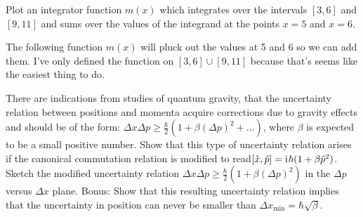 \documentclass[boxes,pages]{homework}
\makeatletter
\newcommand{\iu}{\mathrm{i}\mkern1mu}
\numberwithin{@problem}{section}
\makeatother
\begin{document}
\begin{problem}
Plot an integrator function $m(x)$ which integrates over the intervals $[3,6]$ and $[9,11]$ and sums over the values of the integrand at the points $x = 5$ and $x = 6$.
\end{problem}

\begin{solution}
	The following function $m(x)$ will pluck out the values at 5 and 6 so we can add them. I've only defined the function on $[3,6]\cup[9,11]$ because that's seems like the easiest thing to do.
	\begin{figure}[h]
		\centering
	\end{figure}
\end{solution}

\setcounter{section}{7}

\begin{problem}
There are indications from studies of quantum gravity, that the uncertainty relation between positions and momenta acquire corrections due to gravity effects and should be of the form: $\Delta x\Delta p\geq \frac{\hbar}{2}(1 + \beta(\Delta p)^2 + \ldots)$, where $\beta$ is expected to be a small positive number. Show that this type of uncertainty relation arises if the canonical commutation relation is modified to read$\comm{\hat{x}}{\hat{p}} = \iu\hbar(1 + \beta\hat{p}^2)$. Sketch the modified uncertainty relation $\Delta x\Delta p\geq\frac{\hbar}{2}(1 + \beta(\Delta p)^2)$ in the $\Delta p$ versus $\Delta x$ plane. Bonus: Show that this resulting uncertainty relation implies that the uncertainty in position can never be smaller than $\Delta x_\text{min} = \hbar\sqrt{\beta}$.
\end{problem}
\end{document}
